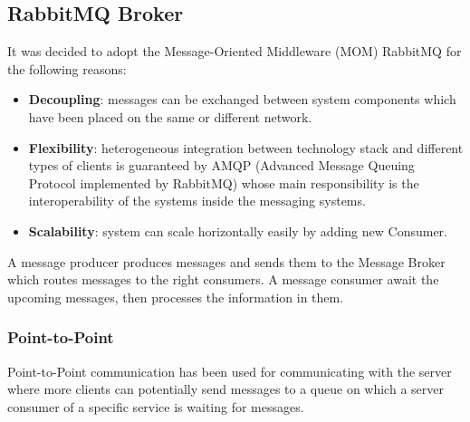 \documentclass[a4paper,12pt]{report}
\begin{document}
\subsection{RabbitMQ Broker}
It was decided to adopt the Message-Oriented Middleware (MOM) RabbitMQ for the following reasons:
\begin{itemize}
\item \textbf{Decoupling}: messages can be exchanged between system components which have been placed on the same or different network.
\item \textbf{Flexibility}: heterogeneous integration between technology stack and different types of clients is guaranteed by AMQP (Advanced Message Queuing Protocol implemented by RabbitMQ) whose main responsibility is the interoperability of the systems inside the messaging systems.
\item \textbf{Scalability}: system can scale horizontally easily by adding new Consumer.
\end{itemize}

A message producer produces messages and sends them to the Message Broker which
routes messages to the right consumers. A message consumer await the upcoming messages, then processes the information in them.

\subsubsection{Point-to-Point}
Point-to-Point communication has been used for communicating with the server where more clients can potentially send messages to a queue on which a server consumer of a specific service is waiting for messages.
\end{document}

